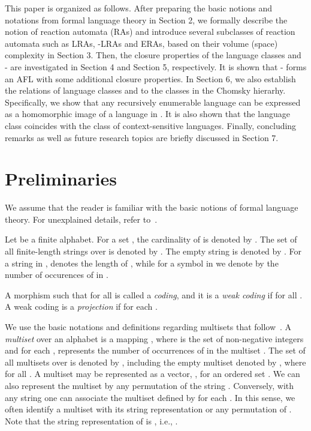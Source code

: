 \documentclass[preprint,fleqn,1p]{elsarticle}
\begin{document}
This paper is organized as follows.  After preparing the basic notions and notations from formal language theory in Section 2, we formally describe  the notion of reaction automata (RAs)  and introduce several subclasses of reaction automata such as LRAs, -LRAs and ERAs, based on their volume (space) complexity in Section 3. Then,  the closure properties of the language classes  and - 
are investigated in  Section 4 and Section 5,  respectively. It is shown  that - forms an AFL with some additional closure properties.  In Section 6, we also establish  the relations of language classes   and  to the classes in the Chomsky hierarhy.  Specifically, we show that  any recursively enumerable language can be expressed as  a homomorphic image of a language in . It is also shown that the language class    coincides with the class of context-sensitive languages.  
Finally,  concluding remarks as well as future research topics are briefly discussed in Section 7.



\section{Preliminaries}

We assume that the reader is familiar with the basic notions of formal language theory.  For unexplained details, refer  to~\cite{HMU:03}. 

Let  be a finite alphabet. For a set , the cardinality of  is denoted by . The set of all finite-length strings over  is denoted by . The empty string is denoted by .  For a string  in ,   denotes the length of , while for a symbol  in  we denote  by   the number of occurences of  in .  

A morphism  such that  for all  is called a \textit{coding}, and it is a \textit{weak coding} if  for all . A weak coding is a \textit{projection} if  for each . 

We use the basic notations and definitions regarding multisets that follow~\cite{CMM:01,KMP:01}.
A {\it multiset} over an alphabet  is a mapping , 
where  is the set of non-negative integers and for each ,  represents the number of occurrences of  in the multiset .  
The set of all multisets over  is denoted by , including the empty multiset denoted by , where  for 
all .  A multiset  may be represented as a vector, , for an ordered set .  We can also represent the multiset  by any permutation of the string . Conversely, with any string  one can associate the multiset  defined by  for each . In this sense, we often identify a multiset  with its string representation  or any permutation of .  Note that the string representation of  is , i.e., .  
\end{document}
